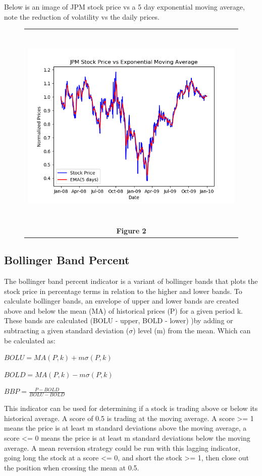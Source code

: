 \documentclass[
	letterpaper, %
]{jdf}
\begin{document}
\pagebreak
Below is an image of JPM stock price vs a 5 day exponential moving average, note the reduction of volatility vs the daily prices.
\begin{figure}[h]
	\begin{tabular}{c}
		\includegraphics[height=10cm]{JPM_ema.png} \\
		\textbf{Figure 2} \\
	\end{tabular}
\end{figure}

\subsection{Bollinger Band Percent}

The bollinger band percent indicator is a variant of bollinger bands that plots the stock price in percentage terms in relation to the higher and lower bands.  To calculate bollinger bands, an envelope of upper and lower bands are created above and below the mean (MA) of historical prices (P) for a given period k.  These bands are calculated (BOLU - upper, BOLD - lower) )by adding or subtracting a given standard deviation ($\sigma$) level (m) from the mean.  Which can be calculated as:

$ BOLU = MA(P, k) + m \sigma(P, k) $

$ BOLD = MA(P, k) - m \sigma(P, k) $

$ BBP = \frac{P - BOLD}{BOLU - BOLD} $

This indicator can be used for determining if a stock is trading above or below its historical average. A score of 0.5 is trading at the moving average. A score >= 1 means the price is at least m standard deviations above the moving average, a score <= 0 means the price is at least m standard deviations below the moving average. A mean reversion strategy could be run with this lagging indicator, going long the stock at a score <= 0, and short the stock >= 1, then close out the position when crossing the mean at 0.5.
\end{document}
